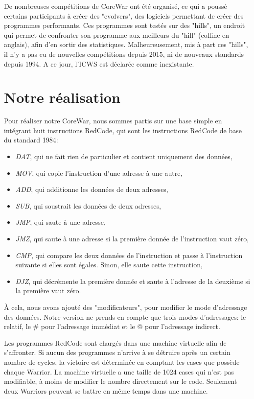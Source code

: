 \documentclass[hidelinks]{report}
\begin{document}
De nombreuses compétitions de CoreWar ont été organisé, ce qui a poussé certains participants à créer des "evolvers", des logiciels permettant de créer des programmes performants. Ces programmes sont testés sur des "hills", un endroit qui permet de confronter son programme aux meilleurs du "hill" (colline en anglais), afin d'en sortir des statistiques. Malheureusement, mis à part ces "hills", il n'y a pas eu de nouvelles compétitions depuis 2015, ni de nouveaux standards depuis 1994. A ce jour, l'ICWS est déclarée comme inexistante.
\section{Notre réalisation}
Pour réaliser notre CoreWar, nous sommes partis sur une base simple en intégrant huit instructions RedCode, qui sont les instructions RedCode de base du standard 1984\cite{standard84}:
\begin{itemize}
    \item \emph{DAT}, qui ne fait rien de particulier et contient uniquement des données,
    \item \emph{MOV}, qui copie l'instruction d'une adresse à une autre,
    \item \emph{ADD}, qui additionne les données de deux adresses,
    \item \emph{SUB}, qui soustrait les données de deux adresses,
    \item \emph{JMP}, qui saute à une adresse,
    \item \emph{JMZ}, qui saute à une adresse si la première donnée de l'instruction vaut zéro,
    \item \emph{CMP}, qui compare les deux données de l'instruction et passe à l'instruction suivante si elles sont égales. Sinon, elle saute cette instruction,
    \item \emph{DJZ}, qui décrémente la première donnée et saute à l'adresse de la deuxième si la première vaut zéro.
\end{itemize}
À cela, nous avons ajouté des "modificateurs", pour modifier le mode d'adressage des données. Notre version ne prends en compte que trois modes d'adressages: le relatif, le \# pour l'adressage immédiat et le @ pour l'adressage indirect.

Les programmes RedCode sont chargés dans une machine virtuelle afin de s'affronter. Si aucun des programmes n'arrive à se détruire après un certain nombre de cycles, la victoire est déterminée en comptant les cases que possède chaque Warrior. La machine virtuelle a une taille de 1024 cases qui n'est pas modifiable, à moins de modifier le nombre directement sur le code. Seulement deux Warriors peuvent se battre en même temps dans une machine.
\end{document}
